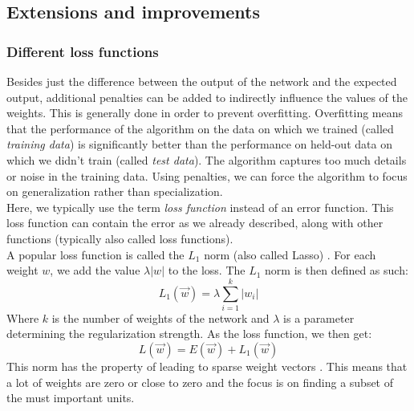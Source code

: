 \subsection{Extensions and improvements} %
\label{ssub:extensions_and_improvements}
\subsubsection{Different loss functions} %
\label{ssub:loss_functions}
Besides just the difference between the output of the network and the expected output, additional penalties can be added to indirectly influence the values of the weights. This is generally done in order to prevent overfitting. Overfitting means that the performance of the algorithm on the data on which we trained (called \textit{training data}) is significantly better than the performance on held-out data on which we didn't train (called \textit{test data}). The algorithm captures too much details or noise in the training data. Using penalties, we can force the algorithm to focus on generalization rather than specialization.\\
Here, we typically use the term \emph{loss function} instead of an error function. This loss function can contain the error as we already described, along with other functions (typically also called loss functions).\\

A popular loss function is called the $L_1$ norm (also called Lasso) \parencite{tibshirani1996regression}. For each weight $w$, we add the value $\lambda \vert w \vert$ to the loss. The $L_1$ norm is then defined as such:
\begin{equation}
    L_1(\overrightarrow{w}) = \lambda \sum_{i=1}^k \vert w_i \vert
\end{equation}
Where $k$ is the number of weights of the network and $\lambda$ is a parameter determining the regularization strength.
As the loss function, we then get:
\begin{equation}
    L(\overrightarrow{w}) = E(\overrightarrow{w}) + L_1(\overrightarrow{w})
\end{equation}
This norm has the property of leading to sparse weight vectors \parencite{journals/ftml/BachJMO12}. This means that a lot of weights are zero or close to zero and the focus is on finding a subset of the must important units.

